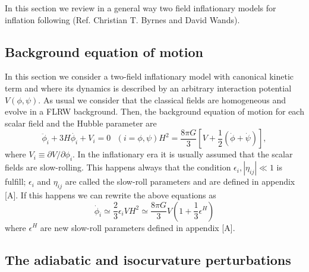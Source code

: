 \documentclass[twocolumn,           %
               showpacs,            %
               preprintnumbers,     %
               aps,                 %
               prl,          	    %
               letterpaper,             %
               superscriptaddress,      %
               nofootinbib,         %
               tightenlines,        %
               floats,floatfix      %
               ,usenatbib,
               ]{revtex4-1}
\begin{document}
In this section we review in a general way two field inflationary models for inflation following (Ref. Christian T. Byrnes and David Wands). 

\subsection{Background equation of motion}

In this section we consider a two-field inflationary model with canonical kinetic term and where its dynamics is described by an arbitrary interaction potential $V(\phi,\psi)$. As usual we consider that the classical fields are homogeneous and evolve in a FLRW background. Then, the background equation of motion for each scalar field and the Hubble parameter are
\begin{subequations}
\begin{equation}
\ddot{\phi}_i+3H\dot{\phi_i}+V_i=0 \ \ \ (i=\phi,\psi)
\end{equation}
\begin{equation}
H^2=\frac{8\pi G}{3}\left[V+\frac{1}{2}\left(\dot{\phi}+\dot\psi\right)\right],
\end{equation}
\end{subequations}
where $V_i\equiv\partial V/\partial \phi_i$. In the inflationary era it is usually assumed that the scalar fields are slow-rolling. This happens always that the condition $\epsilon_i,|\eta_{ij}|\ll 1$ is fulfill; $\epsilon_i$ and $\eta_{ij}$ are called the slow-roll parameters and are defined in appendix [A]. If this happens we can rewrite the above equations as
\begin{subequations}
\begin{equation}
\dot{\phi}_i\simeq \frac{2}{3}\epsilon_i V
\end{equation}
\begin{equation}
H^2\simeq \frac{8\pi G}{3}V\left(1+\frac{1}{3}\epsilon^H\right)
\end{equation}
\end{subequations}
where $\epsilon^H$ are new slow-roll parameters defined in appendix [A]. 
\subsection{The adiabatic and isocurvature perturbations}
\end{document}
